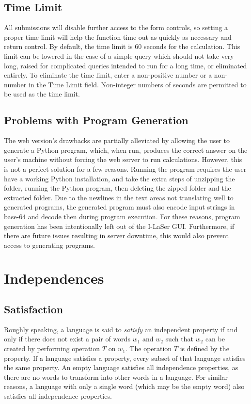\documentclass{article}
\begin{document}
\subsection{Time Limit}
All submissions will disable further access to the form controls, so setting a proper time limit will help the function time out as quickly as necessary and return control. 
By default, the time limit is 60 seconds for the calculation. This limit can be lowered in the case of a simple query which should not take very long, raised for complicated queries intended to run for a long time, or eliminated entirely.
To eliminate the time limit, enter a non-positive number or a non-number in the Time Limit field.
Non-integer numbers of seconds are permitted to be used as the time limit.

\subsection{Problems with Program Generation}
\par The web version's drawbacks are partially alleviated by allowing the user to generate a Python program, which, when run, produces the correct answer on the user's machine without forcing the web server to run calculations. However, this is not a perfect solution for a few reasons. Running the program requires the user have a working Python installation, and take the extra steps of unzipping the folder, running the Python program, then deleting the zipped folder and the extracted folder. Due to the newlines in the text areas not translating well to generated programs, the generated program must also encode input strings in base-64 and decode then during program execution. For these reasons, program generation has been intentionally left out of the I-LaSer GUI. Furthermore, if there are future issues resulting in server downtime, this would also prevent access to generating programs.

\section{Independences}

\subsection{Satisfaction}
\par Roughly speaking, a language is said to \textit{satisfy} an independent property if and only if there does not exist a pair of words $w_1$ and $w_2$ such that $w_2$ can be created by performing operation $T$ on $w_1$. The operation $T$ is defined by the property. If a language satisfies a property, every subset of that language satisfies the same property. An empty language satisfies all independence properties, as there are no words to transform into other words in a language. For similar reasons, a language with only a single word (which may be the empty word) also satisfies all independence properties. 
\end{document}
